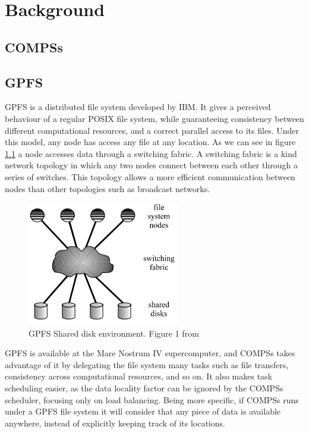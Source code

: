 \chapter{Background}
\label{sec:state_of_the_art}


\section{COMPSs}
\label{subsec:compss_state_of_the_art}


\newpage

\section{GPFS}
\label{subsec:gpfs}
GPFS \cite{schmuck2002gpfs} is a distributed file system developed by IBM. It gives a perceived behaviour of a regular POSIX file system, while guaranteeing consistency between different computational resources, and a correct parallel access to its files. Under this model, any node has access any file at any location. As we can see in figure \ref{fig:gpfs_schema} a node accesses data through a switching fabric. A switching fabric is a kind network topology in which any two nodes connect between each other through a series of switches. This topology allows a more efficient communication between nodes than other topologies such as broadcast networks.
\begin{figure}[ht!]
\centering
\includegraphics{figures/gpfs_schema.png}
\caption{GPFS Shared disk environment. Figure 1 from \cite{schmuck2002gpfs}}
\label{fig:gpfs_schema}
\end{figure}
GPFS is available at the Mare Nostrum IV supercomputer, and COMPSs takes advantage of it by delegating the file system many tasks such as file transfers, consistency across computational resources, and so on. It also makes task scheduling easier, as the data locality factor can be ignored by the COMPSs scheduler, focusing only on load balancing. Being more specific, if COMPSs runs under a GPFS file system it will consider that any piece of data is available anywhere, instead of explicitly keeping track of its locations.

